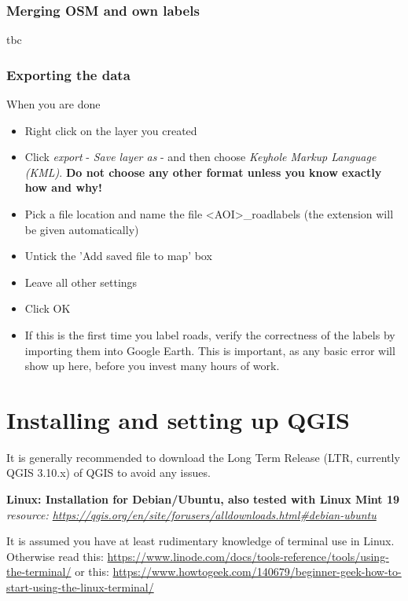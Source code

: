 \documentclass[12pt,a4paper]{scrartcl}
\begin{document}
\subsubsection{Merging OSM and own labels}
tbc

\subsubsection{Exporting the data}
When you are done 
\begin{itemize}
	\item Right click on the layer you created
	\item Click  \textit{export} - \textit{Save layer as} - and then choose \textit{Keyhole Markup Language (KML)}. \textbf{Do not choose any other format unless you know exactly how and why!}
	\item Pick a file location and name the file <AOI>\_roadlabels (the extension will be given automatically)
	\item Untick the 'Add saved file to map' box
	\item Leave all other settings
	\item Click OK
	\item If this is the first time you label roads, verify the correctness of the labels by importing them into Google Earth. This is important, as any basic error will show up here, before you invest many hours of work.
\end{itemize}


\section{Installing and setting up QGIS}
\label{sec:qgis_install}
It is generally recommended to download the Long Term Release (LTR, currently QGIS 3.10.x) of QGIS to avoid any issues. \newline

\textbf{Linux: Installation for Debian/Ubuntu, also tested with Linux Mint 19} \newline
\textit{resource: \url{https://qgis.org/en/site/forusers/alldownloads.html\#debian-ubuntu}} \newline 

It is assumed you have at least rudimentary knowledge of terminal use in Linux. \newline
Otherwise read this: 
\url{https://www.linode.com/docs/tools-reference/tools/using-the-terminal/} \newline
or this: 
\url{https://www.howtogeek.com/140679/beginner-geek-how-to-start-using-the-linux-terminal/} \newline
\end{document}
